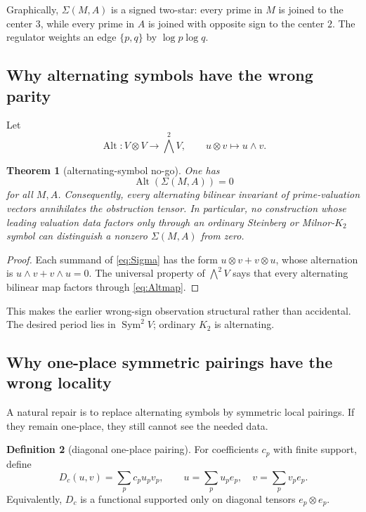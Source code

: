 \documentclass[11pt]{article}
\numberwithin{equation}{section}
\newtheorem{theorem}{Theorem}[section]
\theoremstyle{definition}
\newtheorem{definition}[theorem]{Definition}
\theoremstyle{remark}
\newcommand{\Sym}{\operatorname{Sym}}
\begin{document}
Graphically, $\Sigma(M,A)$ is a signed two-star: every prime in $M$ is joined to the center $3$, while every prime in $A$ is joined with opposite sign to the center $2$.  The regulator weights an edge $\{p,q\}$ by $\log p\log q$.

\subsection{Why alternating symbols have the wrong parity}

Let
\begin{equation}\label{eq:Altmap}
  \operatorname{Alt}:V\otimes V\longrightarrow\bigwedge^2V,
  \qquad u\otimes v\longmapsto u\wedge v.
\end{equation}

\begin{theorem}[alternating-symbol no-go]\label{thm:alternatingnogo}
One has
\begin{equation}\label{eq:AltSigma}
  \operatorname{Alt}(\Sigma(M,A))=0
\end{equation}
for all $M,A$.  Consequently, every alternating bilinear invariant of prime-valuation vectors annihilates the obstruction tensor.  In particular, no construction whose leading valuation data factors only through an ordinary Steinberg or Milnor-$K_2$ symbol \cite{Milnor,Weibel} can distinguish a nonzero $\Sigma(M,A)$ from zero.
\end{theorem}

\begin{proof}
Each summand of \eqref{eq:Sigma} has the form $u\otimes v+v\otimes u$, whose alternation is $u\wedge v+v\wedge u=0$.  The universal property of $\bigwedge^2V$ says that every alternating bilinear map factors through \eqref{eq:Altmap}.
\end{proof}

This makes the earlier wrong-sign observation structural rather than accidental.  The desired period lies in $\Sym^2V$; ordinary $K_2$ is alternating.

\subsection{Why one-place symmetric pairings have the wrong locality}

A natural repair is to replace alternating symbols by symmetric local pairings.  If they remain one-place, they still cannot see the needed data.

\begin{definition}[diagonal one-place pairing]\label{def:diagonal}
For coefficients $c_p$ with finite support, define
\begin{equation}\label{eq:diagonalpairing}
  D_c(u,v)=\sum_pc_pu_pv_p,
  \qquad
  u=\sum_pu_pe_p,
  \quad v=\sum_pv_pe_p.
\end{equation}
Equivalently, $D_c$ is a functional supported only on diagonal tensors $e_p\otimes e_p$.
\end{definition}
\end{document}
